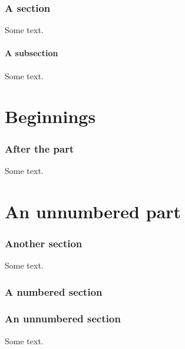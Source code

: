 \documentclass{article}
\begin{document}
\tableofcontents
\section{A section}
Some text.
\subsection{A subsection}
Some text.
\part{Beginnings}
\section{After the part}
Some text.
\part*{An unnumbered part}
\section{Another section}
Some text.
\section{A numbered section}
\section*{An unnumbered section}
Some text.
\end{document}
